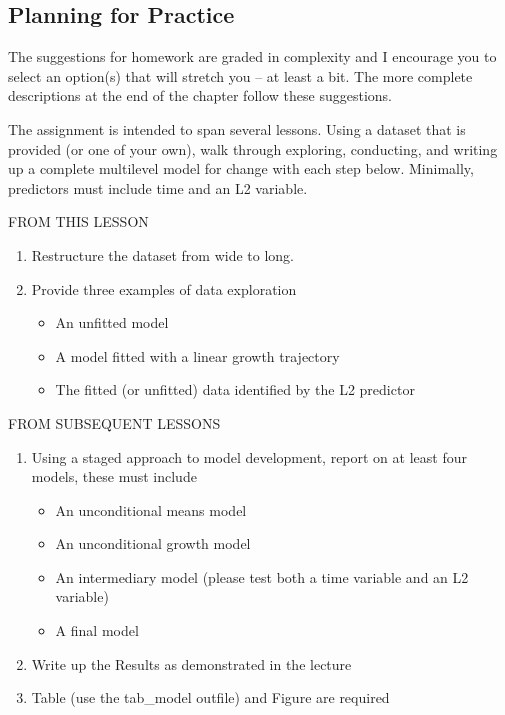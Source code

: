 \documentclass[
  11pt,
]{book}
\providecommand{\tightlist}{%
  \setlength{\itemsep}{0pt}\setlength{\parskip}{0pt}}
\begin{document}
\hypertarget{planning-for-practice-1}{%
\subsection{Planning for Practice}\label{planning-for-practice-1}}

The suggestions for homework are graded in complexity and I encourage you to select an option(s) that will stretch you -- at least a bit. The more complete descriptions at the end of the chapter follow these suggestions.

The assignment is intended to span several lessons. Using a dataset that is provided (or one of your own), walk through exploring, conducting, and writing up a complete multilevel model for change with each step below. Minimally, predictors must include time and an L2 variable.

FROM THIS LESSON

\begin{enumerate}
\def\labelenumi{\arabic{enumi}.}
\tightlist
\item
  Restructure the dataset from wide to long.
\item
  Provide three examples of data exploration

  \begin{itemize}
  \tightlist
  \item
    An unfitted model
  \item
    A model fitted with a linear growth trajectory
  \item
    The fitted (or unfitted) data identified by the L2 predictor
  \end{itemize}
\end{enumerate}

FROM SUBSEQUENT LESSONS

\begin{enumerate}
\def\labelenumi{\arabic{enumi}.}
\setcounter{enumi}{2}
\tightlist
\item
  Using a staged approach to model development, report on at least four models, these must include

  \begin{itemize}
  \tightlist
  \item
    An unconditional means model
  \item
    An unconditional growth model
  \item
    An intermediary model (please test both a time variable and an L2 variable)
  \item
    A final model
  \end{itemize}
\item
  Write up the Results as demonstrated in the lecture
\item
  Table (use the tab\_model outfile) and Figure are required
\end{enumerate}
\end{document}
